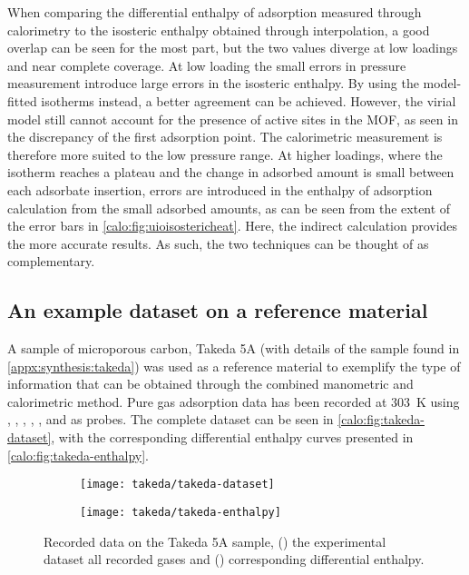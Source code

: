 When comparing the differential enthalpy of adsorption measured through
calorimetry to the isosteric enthalpy obtained through interpolation, 
a good overlap can be seen for the most part, but the two values
diverge at low loadings and near complete coverage. 
At low loading the small errors in pressure measurement introduce
large errors in the isosteric enthalpy. By using the model-fitted 
isotherms instead, a better agreement can be achieved. However, the 
virial model still cannot account for the presence of active sites in the 
\gls{MOF}, as seen in the discrepancy of the first adsorption point.
The calorimetric measurement is therefore more suited to the low pressure
range. At higher loadings, where the isotherm reaches a plateau and
the change in adsorbed amount is small between each adsorbate
insertion, errors are introduced in the enthalpy of adsorption 
calculation from the small adsorbed amounts, as can be seen from the
extent of the error bars in \autoref{calo:fig:uioisostericheat}.
Here, the indirect calculation provides the more accurate results.
As such, the two techniques can be thought of as complementary.

\subsection{An example dataset on a reference material}

A sample of microporous carbon, Takeda 5A (with details of the sample 
found in \autoref{appx:synthesis:takeda})
was used as a reference material to exemplify the type of information
that can be obtained through the combined manometric and 
calorimetric method. Pure gas adsorption data has been recorded at 
\SI{303}{\kelvin} using , , , , ,
 and  as probes. The complete dataset can be seen 
in \autoref{calo:fig:takeda-dataset}, with the corresponding differential 
enthalpy curves presented in \autoref{calo:fig:takeda-enthalpy}.

\begin{figure}[ht]

	\centering
	\begin{subfigure}[b]{.45\textwidth}
		\centering
		\texttt{[image: takeda/takeda-dataset]}
		\caption{}%
		\label{calo:fig:takeda-dataset}
	\end{subfigure}%
	\quad
	\begin{subfigure}[b]{.45\textwidth}
		\centering
		\texttt{[image: takeda/takeda-enthalpy]}
		\caption{}%
		\label{calo:fig:takeda-enthalpy}
	\end{subfigure}
	\caption{Recorded data on the Takeda 5A sample, 
		(\protect{}) the
		experimental dataset all recorded gases and 
		(\protect{}) 
		corresponding differential enthalpy.}%
	\label{calo:fig:takeda-data}

\end{figure}

